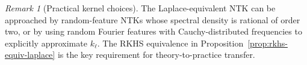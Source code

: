 \documentclass[11pt]{article}
\theoremstyle{remark}
\newtheorem{remark}{Remark}
\begin{document}
\begin{remark}[Practical kernel choices]
The Laplace-equivalent NTK can be approached by random-feature NTKs whose spectral density is rational of order two, or by using random Fourier features with Cauchy-distributed frequencies to explicitly approximate $k_\ell$. The RKHS equivalence in Proposition~\ref{prop:rkhs-equiv-laplace} is the key requirement for theory-to-practice transfer.
\end{remark}
\end{document}
